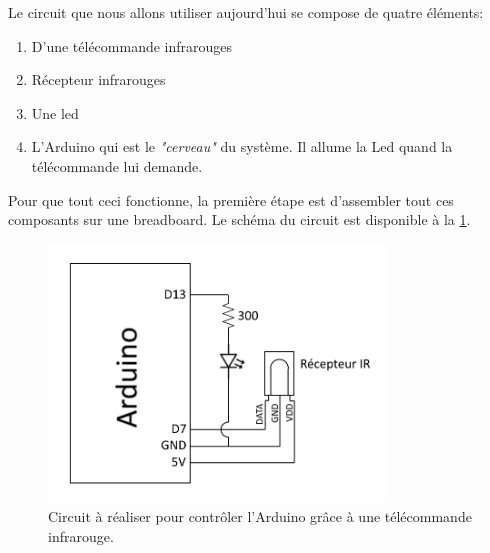 Le circuit que nous allons utiliser aujourd'hui se compose de quatre éléments:
\begin{enumerate}
  \item D'une télécommande infrarouges
  \item Récepteur infrarouges
  \item Une led
  \item L'Arduino qui est le \textit{"cerveau"} du système. Il allume la Led quand la télécommande lui demande.
\end{enumerate}

Pour que tout ceci fonctionne, la première étape est d'assembler tout ces composants sur une breadboard. Le schéma du circuit est disponible à la \ref{fig:circuit}.

\begin{figure}[!t]
\centering
\includegraphics[width=0.8\textwidth]{imgs/circuit.png}
\caption{Circuit à réaliser pour contrôler l'Arduino grâce à une télécommande infrarouge.}
\label{fig:circuit}
\end{figure}
